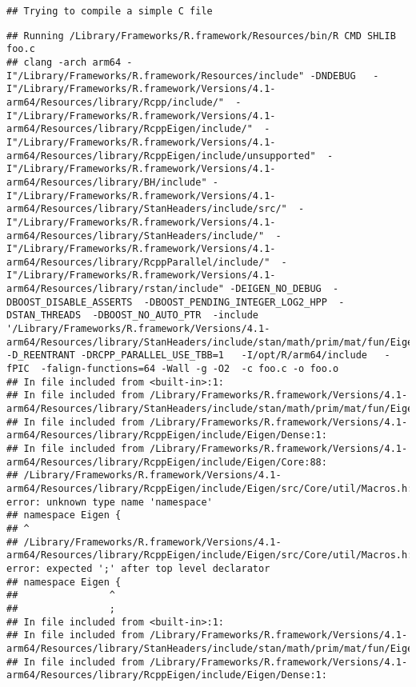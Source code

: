 \documentclass[
]{article}
\begin{document}
\begin{verbatim}
## Trying to compile a simple C file
\end{verbatim}

\begin{verbatim}
## Running /Library/Frameworks/R.framework/Resources/bin/R CMD SHLIB foo.c
## clang -arch arm64 -I"/Library/Frameworks/R.framework/Resources/include" -DNDEBUG   -I"/Library/Frameworks/R.framework/Versions/4.1-arm64/Resources/library/Rcpp/include/"  -I"/Library/Frameworks/R.framework/Versions/4.1-arm64/Resources/library/RcppEigen/include/"  -I"/Library/Frameworks/R.framework/Versions/4.1-arm64/Resources/library/RcppEigen/include/unsupported"  -I"/Library/Frameworks/R.framework/Versions/4.1-arm64/Resources/library/BH/include" -I"/Library/Frameworks/R.framework/Versions/4.1-arm64/Resources/library/StanHeaders/include/src/"  -I"/Library/Frameworks/R.framework/Versions/4.1-arm64/Resources/library/StanHeaders/include/"  -I"/Library/Frameworks/R.framework/Versions/4.1-arm64/Resources/library/RcppParallel/include/"  -I"/Library/Frameworks/R.framework/Versions/4.1-arm64/Resources/library/rstan/include" -DEIGEN_NO_DEBUG  -DBOOST_DISABLE_ASSERTS  -DBOOST_PENDING_INTEGER_LOG2_HPP  -DSTAN_THREADS  -DBOOST_NO_AUTO_PTR  -include '/Library/Frameworks/R.framework/Versions/4.1-arm64/Resources/library/StanHeaders/include/stan/math/prim/mat/fun/Eigen.hpp'  -D_REENTRANT -DRCPP_PARALLEL_USE_TBB=1   -I/opt/R/arm64/include   -fPIC  -falign-functions=64 -Wall -g -O2  -c foo.c -o foo.o
## In file included from <built-in>:1:
## In file included from /Library/Frameworks/R.framework/Versions/4.1-arm64/Resources/library/StanHeaders/include/stan/math/prim/mat/fun/Eigen.hpp:13:
## In file included from /Library/Frameworks/R.framework/Versions/4.1-arm64/Resources/library/RcppEigen/include/Eigen/Dense:1:
## In file included from /Library/Frameworks/R.framework/Versions/4.1-arm64/Resources/library/RcppEigen/include/Eigen/Core:88:
## /Library/Frameworks/R.framework/Versions/4.1-arm64/Resources/library/RcppEigen/include/Eigen/src/Core/util/Macros.h:628:1: error: unknown type name 'namespace'
## namespace Eigen {
## ^
## /Library/Frameworks/R.framework/Versions/4.1-arm64/Resources/library/RcppEigen/include/Eigen/src/Core/util/Macros.h:628:16: error: expected ';' after top level declarator
## namespace Eigen {
##                ^
##                ;
## In file included from <built-in>:1:
## In file included from /Library/Frameworks/R.framework/Versions/4.1-arm64/Resources/library/StanHeaders/include/stan/math/prim/mat/fun/Eigen.hpp:13:
## In file included from /Library/Frameworks/R.framework/Versions/4.1-arm64/Resources/library/RcppEigen/include/Eigen/Dense:1:

\end{verbatim}
\end{document}
